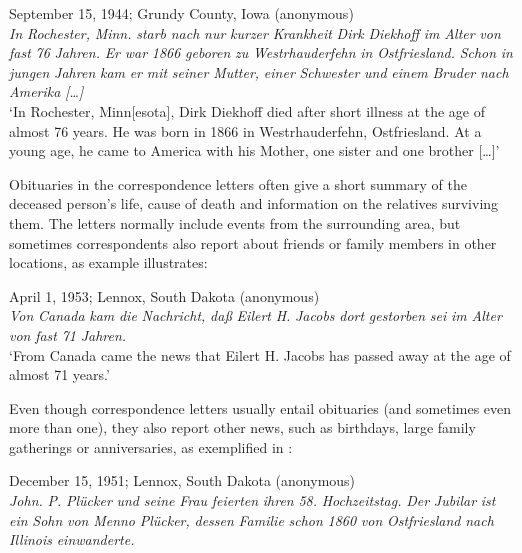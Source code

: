 \documentclass[output=paper]{langsci/langscibook}
\begin{document}
\ea
\label{ex:rocker:4}
September 15, 1944; Grundy County, Iowa (anonymous)\\
\textit{In} \textit{Rochester,} \textit{Minn.} \textit{starb} \textit{nach} \textit{nur} \textit{kurzer} \textit{Krankheit} \textit{Dirk} \textit{Diekhoff} \textit{im} \textit{Alter} \textit{von} \textit{fast} \textit{76}  \textit{Jahren.} \textit{Er} \textit{war} \textit{1866} \textit{geboren} \textit{zu} \textit{Westrhauderfehn} \textit{in} \textit{Ostfriesland.} \textit{Schon} \textit{in} \textit{jungen} \textit{Jahren}  \textit{kam} \textit{er} \textit{mit} \textit{seiner} \textit{Mutter,} \textit{einer} \textit{Schwester} \textit{und} \textit{einem} \textit{Bruder} \textit{nach} \textit{Amerika} \textit{[…]}\\

‘In Rochester, Minn[esota], Dirk Diekhoff died after short illness at the age of almost 76  years. He was born in 1866 in Westrhauderfehn, Ostfriesland. At a young age, he came to America with his Mother, one sister and one brother […]’ 
\z

Obituaries in the correspondence letters often give a short summary of the deceased person’s life, cause of death and information on the relatives surviving them. The letters normally include events from the surrounding area, but sometimes correspondents also report about friends or family members in other locations, as example  illustrates:

\ea
\label{ex:rocker:5}
April 1, 1953; Lennox, South Dakota (anonymous)\\
 
\textit{Von} \textit{Canada} \textit{kam} \textit{die} \textit{Nachricht,} \textit{daß} \textit{Eilert} \textit{H.} \textit{Jacobs} \textit{dort} \textit{gestorben} \textit{sei} \textit{im} \textit{Alter} \textit{von} \textit{fast}  \textit{71} \textit{Jahren.} \\

‘From Canada came the news that Eilert H. Jacobs has passed away at the age of almost 71 years.’
\z

Even though correspondence letters usually entail obituaries (and sometimes even more than one), they also report other news, such as birthdays, large family gatherings or anniversaries, as exemplified in :

  
\ea
\label{ex:rocker:6}
December 15, 1951; Lennox, South Dakota (anonymous)\\
 
\textit{John.} \textit{P.} \textit{Plücker} \textit{und} \textit{seine} \textit{Frau} \textit{feierten} \textit{ihren} \textit{58.} \textit{Hochzeitstag.} \textit{Der} \textit{Jubilar} \textit{ist} \textit{ein} \textit{Sohn}  \textit{von} \textit{Menno} \textit{Plücker,} \textit{dessen} \textit{Familie} \textit{schon} \textit{1860} \textit{von} \textit{Ostfriesland} \textit{nach} \textit{Illinois} \textit{einwanderte.}\\
\end{document}
